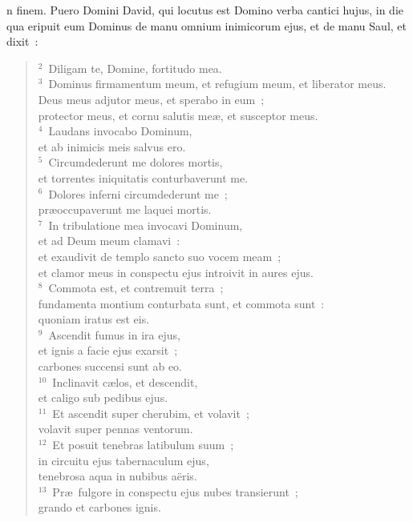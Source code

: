 \bchapter[Psalm]
n finem. Puero Domini David, qui locutus est Domino verba cantici hujus, in die qua eripuit eum Dominus de manu omnium inimicorum ejus, et de manu Saul, et dixit~:
\begin{verse}${}^{2}$~Diligam te, Domine, fortitudo mea.\\
${}^{3}$~Dominus firmamentum meum, et refugium meum, et liberator meus.\\ Deus meus adjutor meus, et sperabo in eum~;\\ protector meus, et cornu salutis me\ae , et susceptor meus.\\
${}^{4}$~Laudans invocabo Dominum,\\ et ab inimicis meis salvus ero.\\
${}^{5}$~Circumdederunt me dolores mortis,\\ et torrentes iniquitatis conturbaverunt me.\\
${}^{6}$~Dolores inferni circumdederunt me~;\\ pr\ae occupaverunt me laquei mortis.\\
${}^{7}$~In tribulatione mea invocavi Dominum,\\ et ad Deum meum clamavi~:\\ et exaudivit de templo sancto suo vocem meam~;\\ et clamor meus in conspectu ejus introivit in aures ejus.\\
${}^{8}$~Commota est, et contremuit terra~;\\ fundamenta montium conturbata sunt, et commota sunt~:\\ quoniam iratus est eis.\\
${}^{9}$~Ascendit fumus in ira ejus,\\ et ignis a facie ejus exarsit~;\\ carbones succensi sunt ab eo.\\
${}^{10}$~Inclinavit c\ae los, et descendit,\\ et caligo sub pedibus ejus.\\
${}^{11}$~Et ascendit super cherubim, et volavit~;\\ volavit super pennas ventorum.\\
${}^{12}$~Et posuit tenebras latibulum suum~;\\ in circuitu ejus tabernaculum ejus,\\ tenebrosa aqua in nubibus a\"eris.\\
${}^{13}$~Pr\ae\ fulgore in conspectu ejus nubes transierunt~;\\ grando et carbones ignis.\\

\end{verse}
